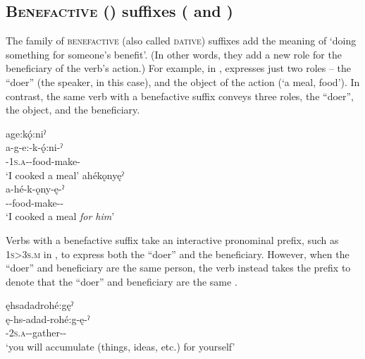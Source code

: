 \z


\subsection{\textsc{Benefactive} (\benefactive) suffixes ( and )} \label{Benefactive suffixes}
The family of \textsc{benefactive} (also called \textsc{dative}) suffixes add the meaning of ‘doing something for someone’s benefit’. (In other words, they add a new role for the beneficiary of the verb’s action.) For example, in ,  expresses just two roles -- the “doer” (the speaker, in this case), and the object of the action (‘a meal, food’). In contrast, the same verb with a benefactive suffix  conveys three roles, the “doer”, the object, and the beneficiary.

\ea\label{ex:benefex}
\ea age:kǫ́:niˀ\\\label{ex:benefexa}
\gll a-g-e:-k-ǫ́:ni-ˀ\\
 {\factual}-\textsc{1s.a}-{\joinerE}-food-make-{\punctual}\\
\glt `I cooked a meal'
\ex ahékǫnyęˀ\\\label{ex:benefexb}
\gll a-hé-k-ǫny-ę-ˀ\\
 {\factual}--food-make-{\benefactive}-{\punctual}\\
\glt `I cooked a meal \emph{for him}'
\z
\z

Verbs with a benefactive suffix take an interactive pronominal prefix, such as  \textsc{1s>3s.m} in , to express both the “doer” and the beneficiary. However, when the “doer” and beneficiary are the same person, the verb instead takes the  {\semireflexive} prefix to denote that the “doer” and beneficiary are the same .

\ea\label{ex:benefex2}
ęhsadadrohé:gęˀ\\
\gll ę-hs-adad-rohé:g-ę-ˀ\\
 \fut-\textsc{2s.a}-{}-gather-{\benefactive}-{\punctual}\\
\glt `you will accumulate (things, ideas, etc.) for yourself'
\z


